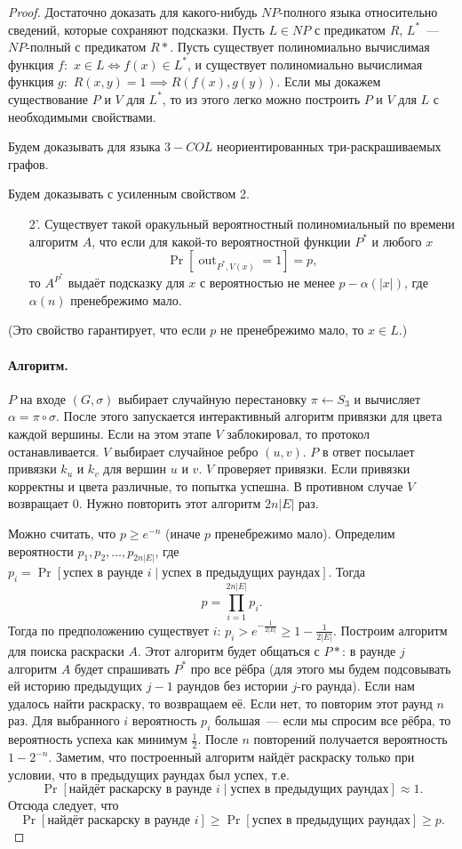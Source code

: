 \documentclass[12pt,a4paper]{article}
\DeclareMathOperator{\out}{out}
\theoremstyle{definition}
\theoremstyle{plain}
\theoremstyle{remark}
\begin{document}
\begin{proof}
Достаточно доказать для какого-нибудь $NP$-полного языка относительно сведений,
которые сохраняют подсказки. 
Пусть $L\in NP$ с предикатом $R$,
$L^*$~--- $NP$-полный с предикатом $R*$. Пусть существует полиномиально вычислимая функция $f:$
$x\in L \iff f(x)\in L^*$,
и существует полиномиально вычислимая функция $g:$
$R(x,y) = 1 \implies R(f(x), g(y))$.
Если мы докажем существование $P$ и $V$ для $L^*$, то из этого легко можно построить $P$ и $V$ для $L$ с необходимыми свойствами.

Будем доказывать для языка $3-COL$ неориентированных три-раскрашиваемых графов.

Будем доказывать с усиленным свойством 2.
{\em
\begin{itemize}
\item[2'.] Существует такой оракульный вероятностный полиномиальный по времени алгоритм $A$, что если для какой-то вероятностной функции $P^*$ и любого $x$
$$
\Pr[\out_{P^*,V(x)} = 1] = p,
$$
то $A^{P^*}$ выдаёт подсказку для $x$ 
с вероятностью не менее $p - \alpha(|x|)$,
где $\alpha(n)$ пренебрежимо мало.
\end{itemize}}
(Это свойство гарантирует, что если $p$ не пренебрежимо мало, то $x\in L$.)

\paragraph{Алгоритм.} $P$ на входе $(G,\sigma)$ выбирает случайную
перестановку $\pi\gets S_3$ и вычисляет
$\alpha = \pi\circ\sigma$. После этого
запускается интерактивный алгоритм привязки для цвета каждой вершины. Если
на этом этапе $V$ заблокировал, то протокол останавливается. 
$V$ выбирает случайное ребро $(u,v)$.
$P$ в ответ посылает привязки $k_u$ и
$k_v$ для вершин $u$ и $v$.
$V$ проверяет привязки. Если привязки корректны и цвета различные, то попытка успешна. В противном случае $V$ возвращает $0$. Нужно повторить этот алгоритм $2n|E|$ раз.

Можно считать, что $p\ge e^{-n}$ (иначе $p$ пренебрежимо мало). Определим вероятности $p_1,p_2,\dotsc,p_{2n|E|}$, где $p_i = \Pr[\text{успех в раунде $i$}\mid \text{успех в предыдущих раундах}].$ Тогда $$p=\prod_{i=1}^{2n|E|} p_i.$$
Тогда по предположению существует $i$: $p_i> e^{-\frac1{2|E|}}\ge 1 - \frac1{2|E|}$.
Построим алгоритм для поиска раскраски $A$. Этот алгоритм будет общаться с $P*$:
в раунде $j$ алгоритм $A$ будет спрашивать $P^*$ про все рёбра (для этого мы будем
подсовывать ей историю предыдущих $j-1$ раундов без истории $j$-го раунда).
Если нам удалось найти раскраску, то возвращаем её. Если нет, то повторим этот раунд $n$ раз. Для выбранного $i$ вероятность $p_i$ большая~--- если мы спросим все рёбра, то вероятность успеха как минимум $\frac{1}{2}$. После $n$ повторений получается вероятность $1-2^{-n}$. Заметим, что построенный алгоритм найдёт раскраску только при условии, что в предыдущих раундах был успех, т.е. 
$$
\Pr[\text{найдёт раскарску в раунде $i$}\mid \text{успех в предыдущих раундах}] \approx 1.
$$
Отсюда следует, что 
\[
\Pr[\text{найдёт раскарску в раунде $i$}] \ge \Pr[\text{успех в предыдущих раундах}] \ge p.
\]



\end{proof}
\end{document}
